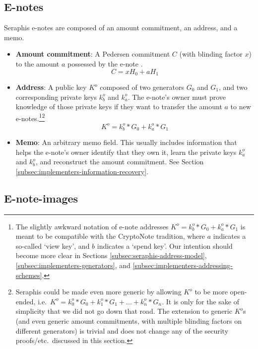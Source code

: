 \subsection{E-notes}
\label{subsec:seraphis-e-notes}

Seraphis e-notes are composed of an amount commitment, an address, and a memo.

\begin{itemize}
    \item \textbf{Amount commitment}: A Pedersen commitment $C$ (with blinding factor $x$) to the amount $a$ possessed by the e-note \cite{Pedersen1992, maxwell-ct-2}.
    \[C = x H_0 + a H_1\]

    \item \textbf{Address}: A public key $K^o$ composed of two generators $G_0$ and $G_1$, and two corresponding private keys $k^o_b$ and $k^o_a$. The e-note's owner must prove knowledge of those private keys if they want to transfer the amount $a$ to new e-notes.\footnote{The slightly awkward notation of e-note addresses $K^o = k^o_b*G_0 + k^o_a*G_1$ is meant to be compatible with the CryptoNote \cite{cryptoNoteWhitePaper} tradition, where $a$ indicates a so-called `view key', and $b$ indicates a `spend key'. Our intention should become more clear in Sections \ref{subsec:seraphis-address-model}, \ref{subsec:implementers-generators}, and \ref{subsec:implementers-addressing-schemes}.}\footnote{Seraphis could be made even more generic by allowing $K^o$ to be more open-ended, i.e.\ $K^o = k^o_0*G_0 + k^o_1*G_1 + ... + k^o_n*G_n$. It is only for the sake of simplicity that we did not go down that road. The extension to generic $K^o$s (and even generic amount commitments, with multiple blinding factors on different generators) is trivial and does not change any of the security proofs/etc.\ discussed in this section.}\vspace{.115cm}
    \[K^o = k^o_b*G_0 + k^o_a*G_1\]

    \item \textbf{Memo}: An arbitrary memo field. This usually includes information that helps the e-note's owner identify that they own it, learn the private keys $k^o_a$ and $k^o_b$, and reconstruct the amount commitment. See Section \ref{subsec:implementers-information-recovery}.
\end{itemize}


\subsection{E-note-images}
\label{subsec:seraphis-e-note-images}

